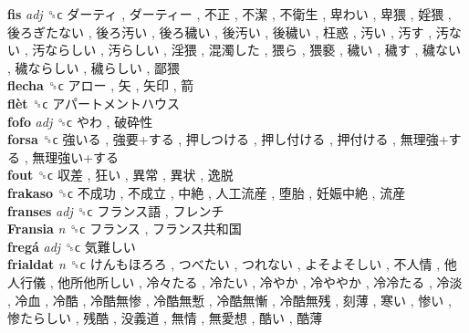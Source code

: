 \textbf{fis} \emph{adj}  ␝ϲ   ダーティ ,  ダーティー ,  不正 ,  不潔 ,  不衛生 ,  卑わい ,  卑猥 ,  婬猥 ,  後ろぎたない ,  後ろ汚い ,  後ろ穢い ,  後汚い ,  後穢い ,  枉惑 ,  汚い ,  汚す ,  汚ない ,  汚ならしい ,  汚らしい ,  淫猥 ,  混濁した ,  猥ら ,  猥褻 ,  穢い ,  穢す ,  穢ない ,  穢ならしい ,  穢らしい ,  鄙猥   \\
\textbf{flecha} ␝ϲ   アロー ,  矢 ,  矢印 ,  箭   \\
\textbf{flèt} ␝ϲ   アパートメントハウス   \\
\textbf{fofo} \emph{adj}  ␝ϲ   やわ ,  破砕性   \\
\textbf{forsa} ␝ϲ   強いる ,  強要+する ,  押しつける ,  押し付ける ,  押付ける ,  無理強+する ,  無理強い+する   \\
\textbf{fout} ␝ϲ   収差 ,  狂い ,  異常 ,  異状 ,  逸脱   \\
\textbf{frakaso} ␝ϲ   不成功 ,  不成立 ,  中絶 ,  人工流産 ,  堕胎 ,  妊娠中絶 ,  流産   \\
\textbf{franses} \emph{adj}  ␝ϲ   フランス語 ,  フレンチ   \\
\textbf{Fransia} \emph{n}  ␝ϲ   フランス ,  フランス共和国   \\
\textbf{fregá} \emph{adj}  ␝ϲ   気難しい   \\
\textbf{frialdat} \emph{n}  ␝ϲ   けんもほろろ ,  つべたい ,  つれない ,  よそよそしい ,  不人情 ,  他人行儀 ,  他所他所しい ,  冷々たる ,  冷たい ,  冷やか ,  冷ややか ,  冷冷たる ,  冷淡 ,  冷血 ,  冷酷 ,  冷酷無惨 ,  冷酷無慙 ,  冷酷無慚 ,  冷酷無残 ,  刻薄 ,  寒い ,  惨い ,  惨たらしい ,  残酷 ,  没義道 ,  無情 ,  無愛想 ,  酷い ,  酷薄   \\
